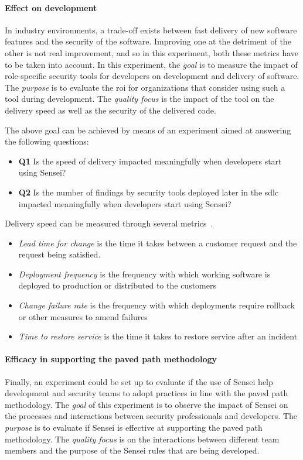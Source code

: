 \paragraph{Effect on development}
In industry environments, a trade-off exists between fast delivery of new software features and the security of the software.
Improving one at the detriment of the other is not real improvement, and so in this experiment, both these metrics have to be taken into account.
In this experiment, the \textit{goal} is to measure the impact of role-specific security tools for developers on development and delivery of software.
The \textit{purpose} is to evaluate the \gls{roi} for organizations that consider using such a tool during development.
The \textit{quality focus} is the impact of the tool on the delivery speed as well as the security of the delivered code.

The above goal can be achieved by means of an experiment aimed at answering the following questions:
\begin{itemize}
    \item \textbf{Q1} Is the speed of delivery impacted meaningfully when developers start using Sensei?
    \item \textbf{Q2} Is the number of findings by security tools deployed later in the \gls{sdlc} impacted meaningfully when developers start using Sensei?
\end{itemize}

Delivery speed can be measured through several metrics~\cite{software-delivery-performance}.
\begin{itemize}
    \item \textit{Lead time for change} is the time it takes between a customer request and the request being satisfied.
    \item \textit{Deployment frequency} is the frequency with which working software is deployed to production or distributed to the customers
    \item \textit{Change failure rate} is the frequency with which deployments require rollback or other measures to amend failures
    \item \textit{Time to restore service} is the time it takes to restore service after an incident
\end{itemize}

\paragraph{Efficacy in supporting the paved path methodology}
Finally, an experiment could be set up to evaluate if the use of Sensei help development and security teams to adopt practices in line with the paved path methodology.
The \textit{goal} of this experiment is to observe the impact of Sensei on the processes and interactions between security professionals and developers.
The \textit{purpose} is to evaluate if Sensei is effective at supporting the paved path methodology.
The \textit{quality focus} is on the interactions between different team members and the purpose of the Sensei rules that are being developed.

